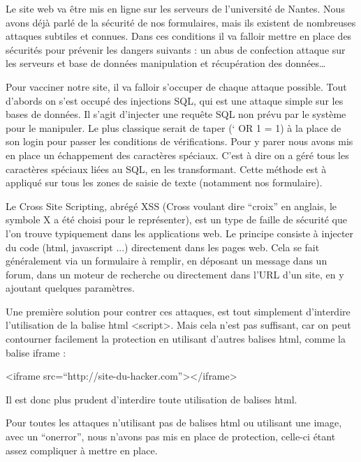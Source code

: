 \documentclass[12pt,a4paper]{article}
\begin{document}
\begin{large}
\begin{onehalfspace}Le site web va être mis en ligne sur les serveurs de l’université de Nantes. Nous avons déjà parlé de la sécurité de nos formulaires, mais ils existent de nombreuses attaques subtiles et connues. Dans ces conditions il va falloir mettre en place des sécurités pour prévenir les dangers suivants :
un abus de confection
attaque sur les serveurs et base de données
manipulation et récupération des données…

    Pour vacciner notre site, il va falloir s’occuper de chaque attaque possible. Tout d’abords on s’est occupé des injections SQL, qui est une attaque simple sur les bases de données. Il s’agit d’injecter une requête SQL non prévu par le système pour le manipuler. Le plus classique serait de taper (‘ OR 1 = 1) à la place de son login pour passer les conditions de vérifications. Pour y parer nous avons mis en place un échappement des caractères spéciaux. C’est à dire on a géré tous les caractères spéciaux liées au SQL, en les transformant. Cette méthode est à appliqué sur tous les zones de saisie de texte (notamment nos formulaire).

	Le Cross Site Scripting, abrégé XSS (Cross voulant dire “croix” en anglais, le symbole X a été choisi pour le représenter), est un type de faille de sécurité que l'on trouve typiquement dans les applications web. Le principe consiste à injecter du code (html, javascript ...) directement dans les pages web. Cela se fait généralement via un formulaire à remplir, en déposant un message dans un forum, dans un moteur de recherche ou directement dans l'URL d'un site, en y ajoutant quelques paramètres.

	Une première solution pour contrer ces attaques, est tout simplement d'interdire l'utilisation de la balise html <script>. Mais cela n'est pas suffisant, car on peut contourner facilement la protection en utilisant d'autres balises html, comme la balise iframe :

    <iframe src=“http://site-du-hacker.com”></iframe>

	Il est donc plus prudent d'interdire toute utilisation de balises html.

	Pour toutes les attaques n’utilisant pas de balises html ou utilisant une image, avec un “onerror”, nous n’avons pas mis en place de protection, celle-ci étant assez compliquer à mettre en place.
\end{onehalfspace}
\end{large}
\end{document}
